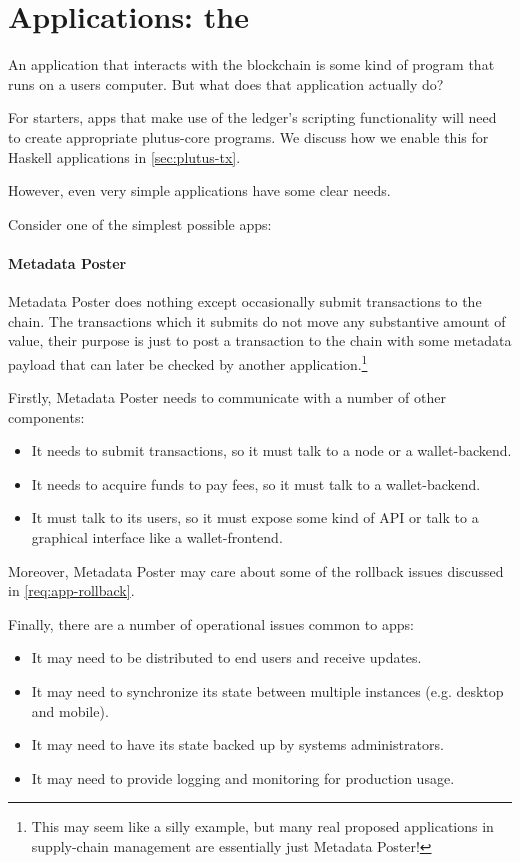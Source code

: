\documentclass[plutus.tex]{subfiles}
\begin{document}
\section{Applications: the }
\label{sec:paf}

An application that interacts with the blockchain is some kind of program that runs on a users computer.
But what does that application actually do?

For starters, \glspl{app} that make use of the ledger's scripting functionality will need to create appropriate \gls{plutus-core} programs.
We discuss how we enable this for Haskell applications in \cref{sec:plutus-tx}.

However, even very simple applications have some clear needs.

Consider one of the simplest possible \glspl{app}:

\paragraph{Metadata Poster}
Metadata Poster does nothing except occasionally submit transactions to the chain.
The transactions which it submits do not move any substantive amount of value, their purpose is just to post a transaction to the chain with some metadata payload that can later be checked by another application.\footnote{
This may seem like a silly example, but many real proposed applications in supply-chain management are essentially just Metadata Poster!
}
\medskip

Firstly, Metadata Poster needs to communicate with a number of other components:
\begin{itemize}
\item It needs to submit transactions, so it must talk to a \gls{node} or a \gls{wallet-backend}.
\item It needs to acquire funds to pay fees, so it must talk to a \gls{wallet-backend}.
\item It must talk to its users, so it must expose some kind of API or talk to a graphical interface like a \gls{wallet-frontend}.
\end{itemize}

Moreover, Metadata Poster may care about some of the rollback issues discussed in \cref{req:app-rollback}.

Finally, there are a number of operational issues common to \glspl{app}:
\begin{itemize}
\item It may need to be distributed to end users and receive updates.
\item It may need to synchronize its state between multiple instances (e.g. desktop and mobile).
\item It may need to have its state backed up by systems administrators.
\item It may need to provide logging and monitoring for production usage.
\end{itemize}
\end{document}
